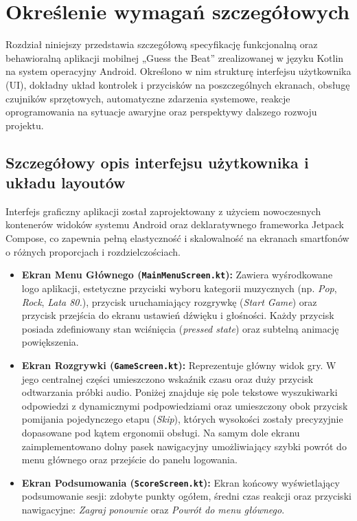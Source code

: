 \newpage
\section{Określenie wymagań szczegółowych}		%

\hspace{0.60cm}Rozdział niniejszy przedstawia szczegółową specyfikację funkcjonalną oraz behawioralną aplikacji mobilnej „Guess the Beat” zrealizowanej w języku Kotlin na system operacyjny Android. Określono w nim strukturę interfejsu użytkownika (UI), dokładny układ kontrolek i przycisków na poszczególnych ekranach, obsługę czujników sprzętowych, automatyczne zdarzenia systemowe, reakcje oprogramowania na sytuacje awaryjne oraz perspektywy dalszego rozwoju projektu.

\subsection{Szczegółowy opis interfejsu użytkownika i układu layoutów}

\hspace{0.60cm}Interfejs graficzny aplikacji został zaprojektowany z użyciem nowoczesnych kontenerów widoków systemu Android oraz deklaratywnego frameworka Jetpack Compose, co zapewnia pełną elastyczność i skalowalność na ekranach smartfonów o różnych proporcjach i rozdzielczościach. 

\begin{itemize}
    \item \textbf{Ekran Menu Głównego (\texttt{MainMenuScreen.kt}):} 
    Zawiera wyśrodkowane logo aplikacji, estetyczne przyciski wyboru kategorii muzycznych (np. \textit{Pop}, \textit{Rock}, \textit{Lata 80.}), przycisk uruchamiający rozgrywkę (\textit{Start Game}) oraz przycisk przejścia do ekranu ustawień dźwięku i głośności. Każdy przycisk posiada zdefiniowany stan wciśnięcia (\textit{pressed state}) oraz subtelną animację powiększenia.
    
    \item \textbf{Ekran Rozgrywki (\texttt{GameScreen.kt}):} 
    Reprezentuje główny widok gry. W jego centralnej części umieszczono wskaźnik czasu oraz duży przycisk odtwarzania próbki audio. Poniżej znajduje się pole tekstowe wyszukiwarki odpowiedzi z dynamicznymi podpowiedziami oraz umieszczony obok przycisk pomijania pojedynczego etapu (\textit{Skip}), których wysokości zostały precyzyjnie dopasowane pod kątem ergonomii obsługi. Na samym dole ekranu zaimplementowano dolny pasek nawigacyjny umożliwiający szybki powrót do menu głównego oraz przejście do panelu logowania.
    
    \item \textbf{Ekran Podsumowania (\texttt{ScoreScreen.kt}):} 
    Ekran końcowy wyświetlający podsumowanie sesji: zdobyte punkty ogółem, średni czas reakcji oraz przyciski nawigacyjne: \textit{Zagraj ponownie} oraz \textit{Powrót do menu głównego}.
\end{itemize}

